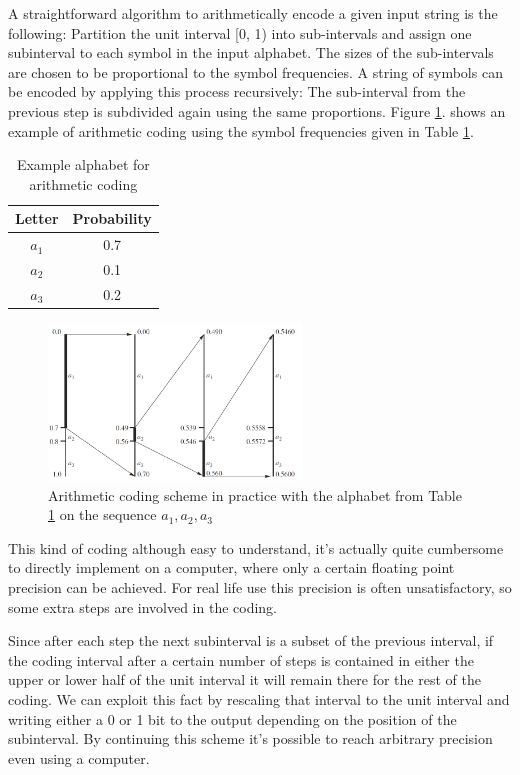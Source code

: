 A straightforward algorithm to arithmetically encode a given input string is the
following: Partition the unit interval [0, 1) into sub-intervals and assign one subinterval
to each symbol in the input alphabet. The sizes of the sub-intervals are
chosen to be proportional to the symbol frequencies. A string of symbols can be
encoded by applying this process recursively: The sub-interval from the previous
step is subdivided again using the same proportions. Figure \ref{fig:arithmetic}. shows an example of
arithmetic coding using the symbol frequencies given in Table \ref{tab:arithmetic}.

\begin{table}
\caption{Example alphabet for arithmetic coding}
\centering
\begin{tabular}{cc}
\toprule
Letter & Probability \\
\midrule
$a_1$ & 0.7 \\
$a_2$ & 0.1 \\
$a_3$ & 0.2 \\
\bottomrule
\end{tabular}
\label{tab:arithmetic}
\end{table}

\begin{figure}
\centering
\includegraphics[width=0.6\textwidth]{arithmetic}
\caption{Arithmetic coding scheme in practice with the alphabet from Table \ref{tab:arithmetic} on the sequence $a_1,a_2,a_3$}
\label{fig:arithmetic}
\end{figure}

This kind of coding although easy to understand, it's actually quite cumbersome to directly implement on a computer, where only a certain floating point precision can be achieved. For real life use this precision is often unsatisfactory, so some extra steps are involved in the coding.

Since after each step the next subinterval is a subset of the previous interval, if the coding interval after a certain number of steps is contained in either the upper or lower half of the unit interval it will remain there for the rest of the coding. We can exploit this fact by rescaling that interval to the unit interval and writing either a 0 or 1 bit to the output depending on the position of the subinterval. By continuing this scheme it's possible to reach arbitrary precision even using a computer.


